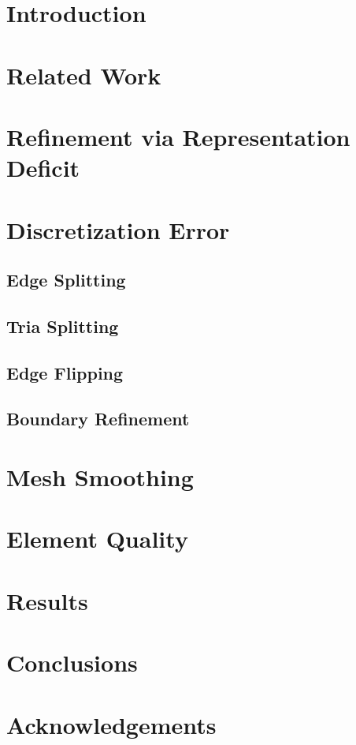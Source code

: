 \documentclass[11pt]{article}
\begin{document}
\section{Introduction}


\section{Related Work}

\section{Refinement via Representation Deficit}


\section{Discretization Error}


\subsection{Edge Splitting}


\subsection{Tria Splitting}


\subsection{Edge Flipping}


\subsection{Boundary Refinement}


\section{Mesh Smoothing}


\section{Element Quality}
\section{Results}
\section{Conclusions}
\section{Acknowledgements}
\end{document}
